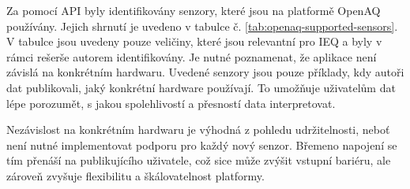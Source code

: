 Za pomocí API byly identifikovány senzory, které jsou na platformě OpenAQ používány. Jejich shrnutí je uvedeno v tabulce č. \ref{tab:openaq-supported-sensors}. V tabulce jsou uvedeny pouze veličiny, které jsou relevantní pro IEQ a byly v rámci rešerše autorem identifikovány. Je nutné poznamenat, že aplikace není závislá na konkrétním hardwaru. Uvedené senzory jsou pouze příklady, kdy autoři dat publikovali, jaký konkrétní hardware používají. To umožňuje uživatelům dat lépe porozumět, s jakou spolehlivostí a přesností data interpretovat. \parencite{API}

Nezávislost na konkrétním hardwaru je výhodná z pohledu udržitelnosti, neboť není nutné implementovat podporu pro každý nový senzor. Břemeno napojení se tím přenáší na publikujícího uživatele, což sice může zvýšit vstupní bariéru, ale zároveň zvyšuje flexibilitu a škálovatelnost platformy.

